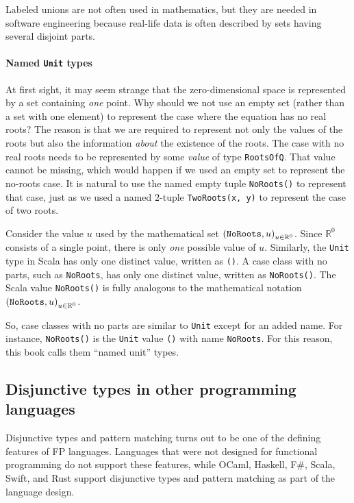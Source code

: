 Labeled unions are not often used in mathematics, but they are needed
in software engineering because real-life data is often described
by sets having several disjoint parts.

\paragraph{Named \texttt{Unit} types}

At first sight, it may seem strange that the zero-dimensional space
is represented by a set containing \emph{one} point. Why should we
not use an empty set (rather than a set with one element) to represent
the case where the equation has no real roots? The reason is that
we are required to represent not only the values of the roots but
also the information \emph{about} the existence of the roots. The
case with no real roots needs to be represented by some \emph{value}
of type \lstinline!RootsOfQ!. That value cannot be missing, which
would happen if we used an empty set to represent the no-roots case.
It is natural to use the named empty tuple \lstinline!NoRoots()!
to represent that case, just as we used a named $2$-tuple \lstinline!TwoRoots(x, y)!
to represent the case of two roots.

Consider the value $u$ used by the mathematical set $\left(\text{\texttt{NoRoots}},u\right)_{u\in\mathbb{R}^{0}}$.
Since $\mathbb{R}^{0}$ consists of a single point, there is only
\emph{one} possible value of $u$. Similarly, the \lstinline!Unit!
type in Scala has only one distinct value, written as \lstinline!()!.
A case class with no parts, such as \lstinline!NoRoots!, has only
one distinct value, written as \lstinline!NoRoots()!. The Scala value
\lstinline!NoRoots()! is fully analogous to the mathematical notation
$\left(\text{\texttt{NoRoots}},u\right)_{u\in\mathbb{R}^{0}}$.

So, case classes with no parts are similar to \lstinline!Unit! except
for an added name. For instance, \lstinline!NoRoots()! is the \lstinline!Unit!
value \lstinline!()! with name \lstinline!NoRoots!. For this reason,
this book calls them \textsf{``}named unit\textsf{''} types.

\subsection{Disjunctive types in other programming languages}

Disjunctive types and pattern matching turns out to be one of the
defining features of FP languages. Languages that were not designed
for functional programming do not support these features, while OCaml,
Haskell, F\#, Scala, Swift, and Rust support disjunctive types and
pattern matching as part of the language design. 

